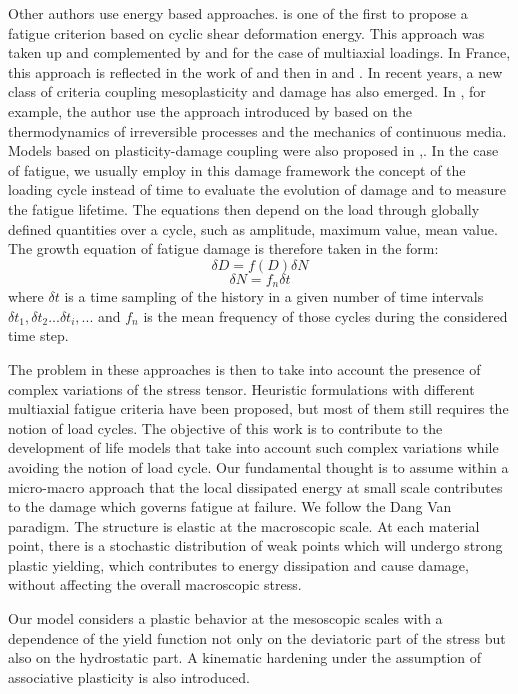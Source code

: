 Other authors use energy based approaches. \cite{ellyin1974criterion} is one of the first to propose a fatigue criterion based on cyclic shear deformation energy. This approach was taken up and complemented by \cite{lefebvre1981cognitive} and \cite{ellyin1991phase} for the case of multiaxial loadings. In France, this approach is reflected in the work of \cite{Froustey1992} and then in \cite{palin1996fatigue} and \cite{banvillet2001prevision}. In recent years, a new class of criteria coupling mesoplasticity and damage has also emerged. In \cite{lemaitre1999two}, for example, the author use the approach introduced by \cite{lemaitre1985mecanique} based on the thermodynamics of irreversible processes and the mechanics of continuous media.   Models based on plasticity-damage coupling were also proposed in \cite{flaceliere2004contribution},\cite{monchiet2006contributions}. In the case of fatigue, we usually employ in this damage framework the concept of the loading cycle instead of time to evaluate the evolution of damage and to measure the fatigue lifetime. The equations then depend on the load through globally defined quantities over a cycle, such as amplitude, maximum value, mean value. The growth equation of fatigue damage is therefore taken in the form:
$$\delta D=f(D)\delta N$$
$$\delta N=f_n\delta t$$
where $\delta t$ is a time sampling of the history in a given number of time intervals $\delta t_1,\delta t_2 ... \delta t_i, ...$ and $f_n$ is the mean frequency of those cycles during the considered time step.

The problem in these approaches is then to take into account the presence of complex variations of the stress tensor. Heuristic formulations with different multiaxial fatigue criteria have been proposed, but most of them still requires the notion of load cycles. The objective of this work is to contribute to the development of life models that take into account such complex variations while avoiding the notion of load cycle. Our fundamental thought is to assume within a micro-macro approach that the local dissipated energy at small scale contributes to the damage which governs fatigue at failure. We follow the Dang Van paradigm. The structure is elastic  at the macroscopic scale. At each material point, there is a stochastic distribution of weak points which will undergo strong plastic yielding, which contributes to energy dissipation and cause damage, without affecting the overall macroscopic stress.

Our model considers a plastic behavior at the mesoscopic scales  with a dependence of the yield function not only on the deviatoric part of the stress but also on the hydrostatic part. A kinematic hardening under the assumption of associative plasticity is also introduced.

